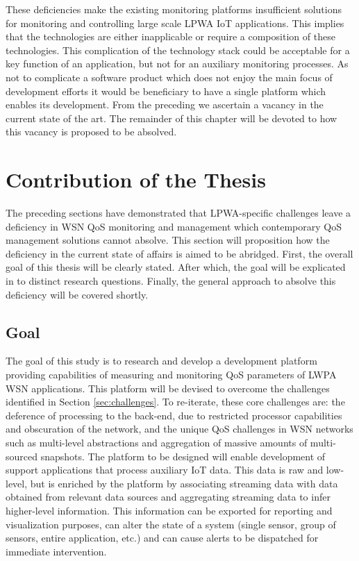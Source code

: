 These deficiencies make the existing monitoring platforms insufficient solutions for monitoring and controlling large scale LPWA IoT applications. This implies that the technologies are either inapplicable or require a composition of these technologies. This complication of the technology stack could be acceptable for a key function of an application, but not for an auxiliary monitoring processes. As not to complicate a software product which does not enjoy the main focus of development efforts it would be beneficiary to have a single platform which enables its development. From the preceding we ascertain a vacancy in the current state of the art. The remainder of this chapter will be devoted to how this vacancy is proposed to be absolved.

\section{Contribution of the Thesis}
The preceding sections have demonstrated that LPWA-specific challenges leave a deficiency in WSN QoS monitoring and management which contemporary QoS management solutions cannot absolve. This section will proposition how the deficiency in the current state of affairs is aimed to be abridged. First, the overall goal of this thesis will be clearly stated. After which, the goal will be explicated in to distinct research questions. Finally, the general approach to absolve this deficiency will be covered shortly.
\subsection{Goal}
\label{sec:goal}
The goal of this study is to research and develop a development platform providing capabilities of measuring and monitoring QoS parameters of LWPA WSN applications. This platform will be devised to overcome the challenges identified in Section \ref{sec:challenges}. To re-iterate, these core challenges are: the deference of processing to the back-end, due to restricted processor capabilities and obscuration of the network, and the unique QoS challenges in WSN networks such as multi-level abstractions and aggregation of massive amounts of multi-sourced snapshots. The platform to be designed will enable development of support applications that process auxiliary IoT data. This data is raw and low-level, but is enriched by the platform by associating streaming data with data obtained from relevant data sources and aggregating streaming data to infer higher-level information. This information can be exported for reporting and visualization purposes, can alter the state of a system (single sensor, group of sensors, entire application, etc.) and can cause alerts to be dispatched for immediate intervention.

